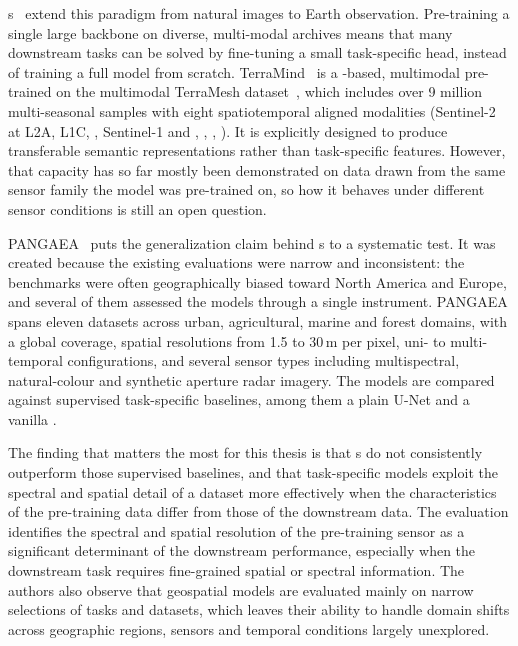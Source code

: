 s~\cite{lu2025vision} extend this paradigm from natural images to Earth observation.
Pre-training a single large backbone on diverse, multi-modal  archives means that many downstream tasks can be solved by fine-tuning a small task-specific head, instead of training a full model from scratch.
TerraMind~\cite{jakubik2025terramind} is a -based, multimodal  pre-trained on the multimodal TerraMesh dataset~\cite{blumenstiel2025terramesh}, which includes over 9 million multi-seasonal samples with eight spatiotemporal aligned modalities (Sentinel-2 at L2A, L1C, , Sentinel-1  and , , , ).
It is explicitly designed to produce transferable semantic representations rather than task-specific features.
However, that capacity has so far mostly been demonstrated on data drawn from the same sensor family the model was pre-trained on, so how it behaves under different sensor conditions is still an open question.

PANGAEA~\cite{marsocci2024pangaea} puts the generalization claim behind s to a systematic test.
It was created because the existing  evaluations were narrow and inconsistent: the benchmarks were often geographically biased toward North America and Europe, and several of them assessed the models through a single instrument.
PANGAEA spans eleven datasets across urban, agricultural, marine and forest domains, with a global coverage, spatial resolutions from 1.5 to 30\,m per pixel, uni- to multi-temporal configurations, and several sensor types including multispectral, natural-colour and synthetic aperture radar imagery.
The models are compared against supervised task-specific baselines, among them a plain U-Net and a vanilla .

The finding that matters the most for this thesis is that s do not consistently outperform those supervised baselines, and that task-specific models exploit the spectral and spatial detail of a dataset more effectively when the characteristics of the pre-training data differ from those of the downstream data.
The evaluation identifies the spectral and spatial resolution of the pre-training sensor as a significant determinant of the downstream performance, especially when the downstream task requires fine-grained spatial or spectral information.
The authors also observe that geospatial models are evaluated mainly on narrow selections of tasks and datasets, which leaves their ability to handle domain shifts across geographic regions, sensors and temporal conditions largely unexplored.

